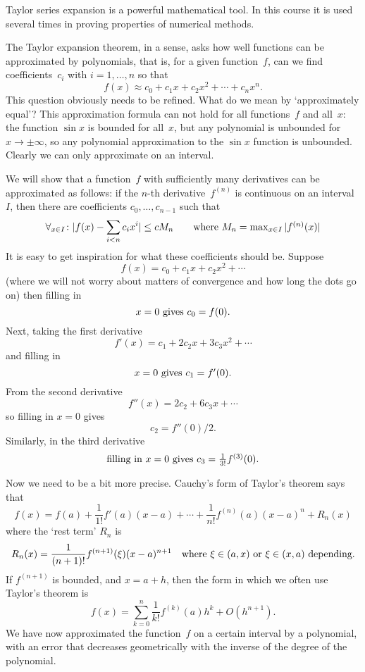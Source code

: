 Taylor series expansion is a powerful mathematical tool. In this
course it is used several times in proving properties of numerical
methods.

The Taylor expansion theorem, in a sense, asks how well functions can
be approximated by polynomials, that is, for a given
function~$f$, can we find coefficients~$c_i$ with $i=1,\ldots,n$ so that
\[ f(x)\approx c_0+c_1x+c_2x^2+\cdots+c_nx^n.\]
This question obviously needs to be refined. What do we mean by
`approximately equal'? This approximation formula can not
hold for all functions~$f$ and all~$x$: the function $\sin x$ is
bounded for all~$x$, but any polynomial is unbounded for $x\rightarrow
\pm\infty$, so any polynomial approximation to the $\sin x$ function
is unbounded. Clearly we can only approximate on an interval.

We will show that a function~$f$ with sufficiently many derivatives
can be approximated as follows: if the $n$-th derivative~$f^{(n)}$ is
continuous on an interval~$I$, then there are coefficients
$c_0,\ldots,c_{n-1}$ such that
\[
  \forall_{x\in I}\colon |f(x)-\sum_{i<n}c_ix^i|\leq cM_n
    \qquad\hbox{where $M_n=\max_{x\in I}|f^{(n)}(x)|$}
\]
It is easy to get inspiration for what these coefficients should
be. Suppose
\[ f(x) = c_0+c_1x+c_2x^2+\cdots \]
(where we will not worry about matters of convergence and how long the
dots go on) then filling in
\[ \hbox{$x=0$ gives $c_0=f(0)$.} \]
Next, taking the first derivative 
\[ f'(x) = c_1+2c_2x+3c_3x^2+\cdots \]
and filling in
\[ \hbox{$x=0$ gives $c_1=f'(0)$.} \]
From the second derivative
\[ f''(x) = 2c_2+6c_3x+\cdots \]
so filling in $x=0$ gives
\[ c_2=f''(0)/2. \]
Similarly, in the third derivative
\[ \hbox{filling in $x=0$ gives $c_3=\frac1{3!}f^{(3)}(0)$.} \]

Now we need to be a bit more precise. Cauchy's form of Taylor's
theorem says that
\[ f(x) = 
    f(a)+\frac1{1!}f'(a)(x-a)+\cdots+\frac1{n!}f^{(n)}(a)(x-a)^n
    +R_n(x)
\]
where the `rest term' $R_n$ is 
\[ R_n(x) = \frac1{(n+1)!}f^{(n+1)}(\xi)(x-a)^{n+1}
    \quad\hbox{where $\xi\in(a,x)$ or $\xi\in(x,a)$ depending.}
\]
If $f^{(n+1)}$ is bounded, and $x=a+h$, then the form in which we
often use
Taylor's theorem is 
\[ f(x) = \sum_{k=0}^n \frac1{k!}f^{(k)}(a)h^k+O(h^{n+1}).\]
We have now approximated the function~$f$ on a certain interval by a
polynomial, with an error that decreases geometrically with the
inverse of the degree of the polynomial.

